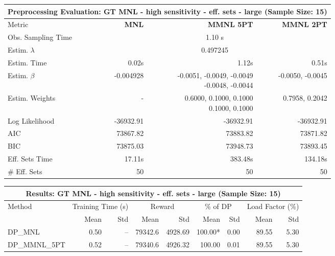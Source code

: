
\begin{samepage}
\begin{center}
  \small
  \begin{tabular}{l|r|r|r}
    \toprule
    \multicolumn{4}{c}{\textbf{Preprocessing Evaluation: GT MNL - high sensitivity - eff. sets - large (Sample Size: 15)}} \\
    \midrule
    Metric & \textbf{MNL} & \textbf{MMNL 5PT} & \textbf{MMNL 2PT} \\
    \midrule
    Obs. Sampling Time & \multicolumn{3}{c}{1.10 s} \\
    Estim. $\lambda$ & \multicolumn{3}{c}{0.497245} \\
    Estim. Time & 0.02s & 1.12s & 0.51s \\
    Estim. $\beta$ & -0.004928 & \makecell[tr]{-0.0051, -0.0049, -0.0049 \\ -0.0048, -0.0044} & -0.0050, -0.0045 \\
    Estim. Weights & - & \makecell[tr]{0.6000, 0.1000, 0.1000 \\ 0.1000, 0.1000} & 0.7958, 0.2042 \\
    Log Likelihood & -36932.91 & -36932.91 & -36932.91 \\
    AIC & 73867.82 & 73883.82 & 73871.82 \\
    BIC & 73875.03 & 73948.73 & 73893.45 \\
    Eff. Sets Time & 17.11s & 383.48s & 134.18s \\
    \# Eff. Sets & 50 & 50 & 50 \\
    \bottomrule
  \end{tabular}
\end{center}
\begin{center}
  \small
  \begin{tabular}{l|rr|rr|rr|rr}
    \toprule
    \multicolumn{9}{c}{\textbf{Results: GT MNL - high sensitivity - eff. sets - large (Sample Size: 15)}} \\
    \midrule
    Method & \multicolumn{2}{c|}{Training Time (s)} & \multicolumn{2}{c|}{Reward} & \multicolumn{2}{c|}{\% of DP} & \multicolumn{2}{c}{Load Factor (\%)} \\
    & Mean & Std & Mean & Std & Mean & Std & Mean & Std \\
    \midrule
    DP\_MNL      &     0.50 &    -- &    79342.6 &    4928.69 & 100.00* &    0.00 &   89.55 &    5.30 \\
    DP\_MMNL\_5PT &     0.52 &    -- &    79340.6 &    4926.32 &  100.00 &    0.01 &   89.55 &    5.30 \\

\end{tabular}
\end{center}
\end{samepage}
